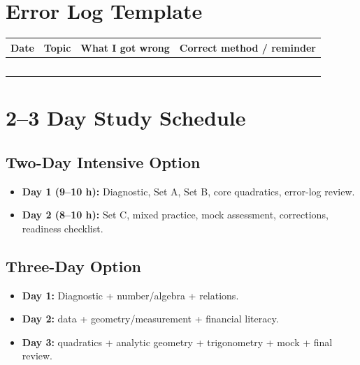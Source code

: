 \documentclass[12pt,oneside]{article}
\begin{document}
\section{Error Log Template}
\renewcommand{\arraystretch}{1.4}
\begin{longtable}{|p{}|p{}|p{}|p{}|}
\hline
Date & Topic & What I got wrong & Correct method / reminder \\
\hline
\rule{0pt}{2.0em} & & & \\
\hline
\rule{0pt}{2.0em} & & & \\
\hline
\rule{0pt}{2.0em} & & & \\
\hline
\rule{0pt}{2.0em} & & & \\
\hline
\rule{0pt}{2.0em} & & & \\
\hline
\end{longtable}
\renewcommand{\arraystretch}{1.0}

\section{2--3 Day Study Schedule}
\subsection*{Two-Day Intensive Option}
\begin{itemize}
  \item \textbf{Day 1 (9--10 h):} Diagnostic, Set A, Set B, core quadratics, error-log review.
  \item \textbf{Day 2 (8--10 h):} Set C, mixed practice, mock assessment, corrections, readiness checklist.
\end{itemize}

\subsection*{Three-Day Option}
\begin{itemize}
  \item \textbf{Day 1:} Diagnostic + number/algebra + relations.
  \item \textbf{Day 2:} data + geometry/measurement + financial literacy.
  \item \textbf{Day 3:} quadratics + analytic geometry + trigonometry + mock + final review.
\end{itemize}
\end{document}
